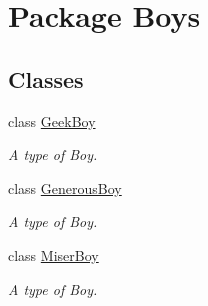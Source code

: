 \hypertarget{namespace_boys}{}\section{Package Boys}
\label{namespace_boys}
\subsection*{Classes}
\begin{DoxyCompactItemize}
\item 
class \hyperlink{class_boys_1_1_geek_boy}{Geek\+Boy}
\begin{DoxyCompactList}\small\item\em A type of Boy. \end{DoxyCompactList}\item 
class \hyperlink{class_boys_1_1_generous_boy}{Generous\+Boy}
\begin{DoxyCompactList}\small\item\em A type of Boy. \end{DoxyCompactList}\item 
class \hyperlink{class_boys_1_1_miser_boy}{Miser\+Boy}
\begin{DoxyCompactList}\small\item\em A type of Boy. \end{DoxyCompactList}\end{DoxyCompactItemize}
